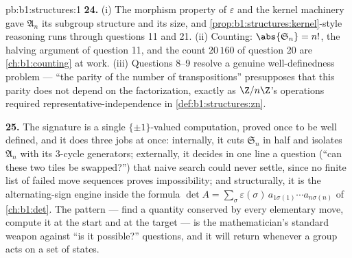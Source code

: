 \begin{solution}{pb:b1:structures:1}
\textbf{24.} (i) The morphism property of $\varepsilon$ and the
kernel machinery gave $\mathfrak A_n$ its subgroup structure and
its size, and \cref{prop:b1:structures:kernel}-style reasoning
runs through questions 11 and 21. (ii) Counting:
$\abs{\mathfrak S_n} = n!$, the halving argument of question 11,
and the count $20\,160$ of question 20 are
\cref{ch:b1:counting} at work. (iii) Questions 8--9 resolve a
genuine well-definedness problem --- ``the parity of the number
of transpositions'' presupposes that this parity does not depend
on the factorization, exactly as $\Z/n\Z$'s operations required
representative-independence in \cref{def:b1:structures:zn}.

\textbf{25.} The signature is a single $\{\pm1\}$-valued
computation, proved once to be well defined, and it does three
jobs at once: internally, it cuts $\mathfrak S_n$ in half and
isolates $\mathfrak A_n$ with its $3$-cycle generators;
externally, it decides in one line a question (``can these two
tiles be swapped?'') that naive search could never settle, since
no finite list of failed move sequences proves impossibility; and
structurally, it is the alternating-sign engine inside the
formula $\det A = \sum_\sigma \varepsilon(\sigma)\,
a_{1\sigma(1)}\cdots a_{n\sigma(n)}$ of \cref{ch:b1:det}. The
pattern --- find a quantity conserved by every elementary move,
compute it at the start and at the target --- is the
mathematician's standard weapon against ``is it possible?''
questions, and it will return whenever a group acts on a set of
states.
\end{solution}
